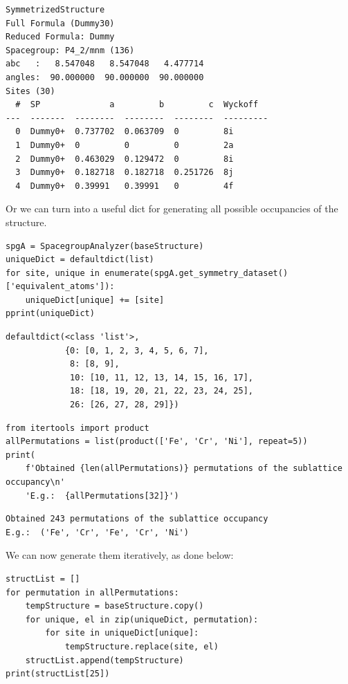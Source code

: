 \begin{verbatim}
SymmetrizedStructure
Full Formula (Dummy30)
Reduced Formula: Dummy
Spacegroup: P4_2/mnm (136)
abc   :   8.547048   8.547048   4.477714
angles:  90.000000  90.000000  90.000000
Sites (30)
  #  SP              a         b         c  Wyckoff
---  -------  --------  --------  --------  ---------
  0  Dummy0+  0.737702  0.063709  0         8i
  1  Dummy0+  0         0         0         2a
  2  Dummy0+  0.463029  0.129472  0         8i
  3  Dummy0+  0.182718  0.182718  0.251726  8j
  4  Dummy0+  0.39991   0.39991   0         4f
\end{verbatim}

Or we can turn into a useful dict for generating all possible
occupancies of the structure.

\begin{verbatim}
spgA = SpacegroupAnalyzer(baseStructure)
uniqueDict = defaultdict(list)
for site, unique in enumerate(spgA.get_symmetry_dataset()['equivalent_atoms']):
    uniqueDict[unique] += [site]
pprint(uniqueDict)
\end{verbatim}

\begin{verbatim}
defaultdict(<class 'list'>,
            {0: [0, 1, 2, 3, 4, 5, 6, 7],
             8: [8, 9],
             10: [10, 11, 12, 13, 14, 15, 16, 17],
             18: [18, 19, 20, 21, 22, 23, 24, 25],
             26: [26, 27, 28, 29]})
\end{verbatim}

\begin{verbatim}
from itertools import product
allPermutations = list(product(['Fe', 'Cr', 'Ni'], repeat=5))
print(
    f'Obtained {len(allPermutations)} permutations of the sublattice occupancy\n'
    'E.g.:  {allPermutations[32]}')
\end{verbatim}

\begin{verbatim}
Obtained 243 permutations of the sublattice occupancy
E.g.:  ('Fe', 'Cr', 'Fe', 'Cr', 'Ni')
\end{verbatim}

We can now generate them iteratively, as done below:

\begin{verbatim}
structList = []
for permutation in allPermutations:
    tempStructure = baseStructure.copy()
    for unique, el in zip(uniqueDict, permutation):
        for site in uniqueDict[unique]:
            tempStructure.replace(site, el)
    structList.append(tempStructure)
print(structList[25])
\end{verbatim}

